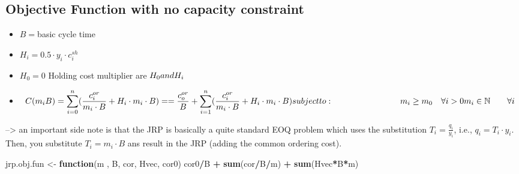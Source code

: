 \documentclass[
]{article}
\newenvironment{Shaded}{\begin{snugshade}}{\end{snugshade}}
\newcommand{\CommentTok}[1]{\textcolor[rgb]{0.56,0.35,0.01}{\textit{#1}}}
\newcommand{\ControlFlowTok}[1]{\textcolor[rgb]{0.13,0.29,0.53}{\textbf{#1}}}
\newcommand{\DataTypeTok}[1]{\textcolor[rgb]{0.13,0.29,0.53}{#1}}
\newcommand{\FloatTok}[1]{\textcolor[rgb]{0.00,0.00,0.81}{#1}}
\newcommand{\KeywordTok}[1]{\textcolor[rgb]{0.13,0.29,0.53}{\textbf{#1}}}
\newcommand{\NormalTok}[1]{#1}
\newcommand{\OperatorTok}[1]{\textcolor[rgb]{0.81,0.36,0.00}{\textbf{#1}}}
\newcommand{\StringTok}[1]{\textcolor[rgb]{0.31,0.60,0.02}{#1}}
\providecommand{\tightlist}{%
  \setlength{\itemsep}{0pt}\setlength{\parskip}{0pt}}
\begin{document}
\begin{Shaded}
\end{Shaded}

\hypertarget{objective-function-with-no-capacity-constraint}{%
\subsection{Objective Function with no capacity
constraint}\label{objective-function-with-no-capacity-constraint}}

\begin{itemize}
\tightlist
\item
  \(B=\)basic cycle time
\item
  \(H_i=0.5 \cdot y_i \cdot c_i^{sh}\)
\item
  \(H_0=0\) Holding cost multiplier are \(H_0 \space and \space H_i\)
\item
  \[C(m_i B)=\sum_{i=0}^n (\frac {c_i^{or}}{m_i \cdot B}+H_i \cdot m_i \cdot B) == \frac {c_o^{or}}{B}+ \sum_{i=1}^n (\frac {c_i^{or}}{m_i \cdot B}+H_i \cdot m_i \cdot B)  \\ subject \space to: \quad \quad \quad \quad \quad \quad \quad \quad \quad  \\ m_i \ge m_0 \quad \forall i >0 \\m_i \in \mathbb N \qquad \forall i   \]
\end{itemize}

--\textgreater{} an important side note is that the JRP is basically a
quite standard EOQ problem which uses the substitution
\(T_i = \frac{q_i}{y_i}\), i.e., \(q_i = T_i \cdot y_i\). Then, you
substitute \(T_i = m_i \cdot B\) ans result in the JRP (adding the
common ordering cost).

\begin{Shaded}
\begin{Highlighting}[]
\NormalTok{jrp.obj.fun <-}\StringTok{ }\ControlFlowTok{function}\NormalTok{(m , B, cor, Hvec, cor0) cor0}\OperatorTok{/}\NormalTok{B }\OperatorTok{+}\StringTok{ }\KeywordTok{sum}\NormalTok{(cor}\OperatorTok{/}\NormalTok{B}\OperatorTok{/}\NormalTok{m) }\OperatorTok{+}\StringTok{ }\KeywordTok{sum}\NormalTok{(Hvec}\OperatorTok{*}\NormalTok{B}\OperatorTok{*}\NormalTok{m)}
\end{Highlighting}
\end{Shaded}
\end{document}
